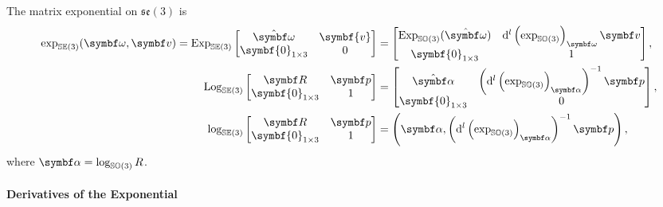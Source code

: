 \begin{important}
  The matrix exponential on $\mathfrak{se}(3)$ is
  \begin{subequations}
    \begin{align}
      \exp_\SEthree (\bomega, \bv) = \Exp_\SEthree \begin{bmatrix}
        \hat{\bomega} & \symbf{v} \\ \symbf{0}_{1 \times 3} & 0
      \end{bmatrix} & = \begin{bmatrix}
        \Exp_{\SOthree}(\hat{\bomega}) & \mathrm{d}^l \left( \exp_{\SOthree} \right)_\bomega \symbf v \\ \symbf{0}_{1 \times 3} & 1
      \end{bmatrix},                                                                                         \\
      \Log_\SEthree \begin{bmatrix}
        \bR & \bp \\ \symbf{0}_{1 \times 3} & 1
      \end{bmatrix}                                & = \begin{bmatrix}
        \hat{\symbf \alpha} & \left( \mathrm{d}^l \left( \exp_{\SOthree} \right)_{\symbf \alpha} \right)^{-1} \bp \\ \symbf{0}_{1 \times 3} & 0
      \end{bmatrix},                                                                                         \\
      \log_\SEthree \begin{bmatrix}
        \bR & \bp \\ \symbf{0}_{1 \times 3} & 1
      \end{bmatrix}                                & = \left(\symbf \alpha, \left( \mathrm{d}^l \left( \exp_{\SOthree} \right)_{\symbf \alpha} \right)^{-1} \bp  \right),
    \end{align}
  \end{subequations}
  where $\symbf \alpha = \log_\SOthree R$.
\end{important}

\paragraph{Derivatives of the Exponential}

